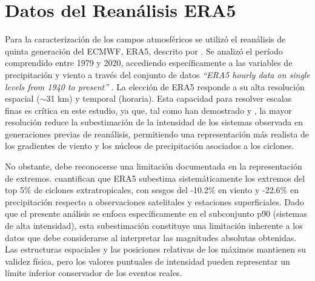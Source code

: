 \section{Datos del Reanálisis ERA5}\label{sec:datos_era5}
Para la caracterización de los campos atmosféricos se utilizó el reanálisis de quinta generación del ECMWF, ERA5, descrito por \citet{hersbach2020era5}. Se analizó el período comprendido entre 1979 y 2020, accediendo específicamente a las variables de precipitación y viento a través del conjunto de datos \textit{``ERA5 hourly data on single levels from 1940 to present''} \citep{hersbach_era5_2023b}. La elección de ERA5 responde a su alta resolución espacial ($\sim$31 km) y temporal (horaria). Esta capacidad para resolver escalas finas es crítica en este estudio, ya que, tal como han demostrado \citet{priestley2022improved} y \citet{dalanhese2023new}, la mayor resolución reduce la subestimación de la intensidad de los sistemas observada en generaciones previas de reanálisis, permitiendo una representación más realista de los gradientes de viento y los núcleos de precipitación asociados a los ciclones.

No obstante, debe reconocerse una limitación documentada en la representación de extremos. \citet{chen2024evaluation} cuantifican que ERA5 subestima sistemáticamente los extremos del top 5\% de ciclones extratropicales, con sesgos del -10.2\% en viento y -22.6\% en precipitación respecto a observaciones satelitales y estaciones superficiales. Dado que el presente análisis se enfoca específicamente en el subconjunto p90 (sistemas de alta intensidad), esta subestimación constituye una limitación inherente a los datos que debe considerarse al interpretar las magnitudes absolutas obtenidas. Las estructuras espaciales y las posiciones relativas de los máximos mantienen su validez física, pero los valores puntuales de intensidad pueden representar un límite inferior conservador de los eventos reales.
